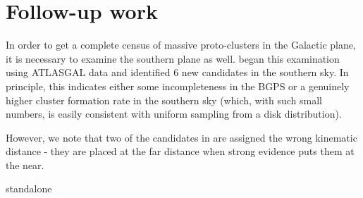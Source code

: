%




\section{Follow-up work}
In order to get a complete census of massive proto-clusters in the Galactic
plane, it is necessary to examine the southern plane as well.
\citet{Urquhart2013a} began this examination using ATLASGAL data and identified
6 new candidates in the southern sky.  In principle, this indicates either some
incompleteness in the BGPS or a genuinely higher cluster formation rate in the
southern sky (which, with such small numbers, is easily consistent with uniform
sampling from a disk distribution).

However, we note that two of the candidates in \citet{Urquhart2013a} are
assigned the wrong kinematic distance - they are placed at the far distance
when strong evidence puts them at the near.

{standalone}



